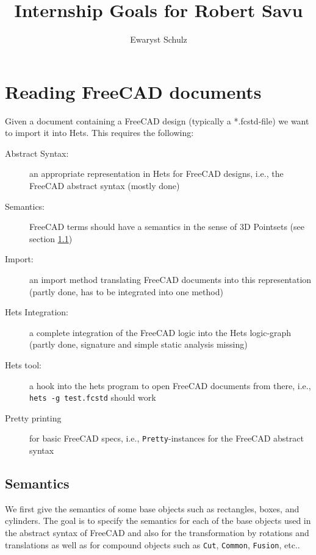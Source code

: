 \documentclass[11pt,draft,a4paper]{article}%
\newcommand{\freecad}{FreeCAD\xspace}
\newcommand{\hets}{Hets\xspace}
\newcommand{\bash}[1]{{\tt #1}}
\newcommand{\haskell}[1]{{\tt #1}}
\begin{document}
\title{Internship Goals for Robert Savu}

\author{Ewaryst Schulz}

\maketitle


\section{Reading \freecad documents}
Given a document containing a \freecad design (typically a *.fcstd-file) we want to import it into \hets. This requires the following:
\begin{description}
  \item[Abstract Syntax:] an appropriate representation in \hets for \freecad designs,
    i.e., the \freecad abstract syntax (mostly done)
  \item[Semantics:] \freecad terms should have a semantics in the sense of 3D Pointsets (see section \ref{sec:semantics})
  \item[Import:] an import method translating \freecad documents into this
    representation (partly done, has to be integrated into one method)
  \item[\hets Integration:] a complete integration of the \freecad logic into the \hets
    logic-graph (partly done, signature and simple static analysis missing)
  \item[\hets tool:] a hook into the hets program to open \freecad documents from there, i.e., \bash{hets -g test.fcstd} should work
  \item[Pretty printing] for basic \freecad specs, i.e.,
    \haskell{Pretty}-instances for the \freecad abstract syntax
\end{description}

\subsection{Semantics}
\label{sec:semantics}
We first give the semantics of some base objects such as rectangles,
boxes, and cylinders. The goal is to specify the semantics for each of
the base objects used in the abstract syntax of \freecad and also for
the transformation by rotations and translations as well as for
compound objects such as \haskell{Cut}, \haskell{Common},
\haskell{Fusion}, etc..
\end{document}
